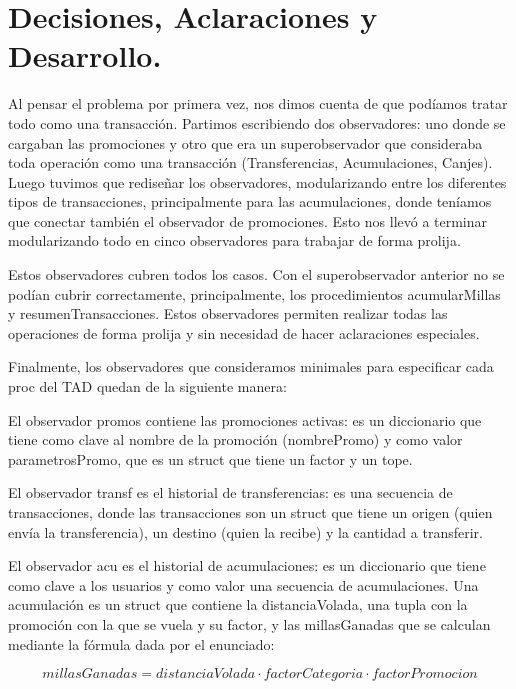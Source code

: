 \documentclass[11pt,a4paper]{article}
\begin{document}
\maketitle

\section{Decisiones, Aclaraciones y Desarrollo.}

Al pensar el problema por primera vez, nos dimos cuenta de que podíamos tratar todo como una transacción. Partimos escribiendo dos observadores: uno donde se cargaban las promociones y otro que era un superobservador que consideraba toda operación como una transacción (Transferencias, Acumulaciones, Canjes). Luego tuvimos que rediseñar los observadores, modularizando entre los diferentes tipos de transacciones, principalmente para las acumulaciones, donde teníamos que conectar también el observador de promociones. Esto nos llevó a terminar modularizando todo en cinco observadores para trabajar de forma prolija.

Estos observadores cubren todos los casos. Con el superobservador anterior no se podían cubrir correctamente, principalmente, los procedimientos acumularMillas y resumenTransacciones. Estos observadores permiten realizar todas las operaciones de forma prolija y sin necesidad de hacer aclaraciones especiales.

Finalmente, los observadores que consideramos minimales para especificar cada proc del TAD quedan de la siguiente manera:

El observador promos contiene las promociones activas: es un diccionario que tiene como clave al nombre de la promoción (nombrePromo) y como valor parametrosPromo, que es un struct que tiene un factor y un tope.

El observador transf es el historial de transferencias: es una secuencia de transacciones, donde las transacciones son un struct que tiene un origen (quien envía la transferencia), un destino (quien la recibe) y la cantidad a transferir.

El observador acu es el historial de acumulaciones: es un diccionario que tiene como clave a los usuarios y como valor una secuencia de acumulaciones. Una acumulación es un struct que contiene la distanciaVolada, una tupla con la promoción con la que se vuela y su factor, y las millasGanadas que se calculan mediante la fórmula dada por el enunciado:

$$
millasGanadas = distanciaVolada \cdot factorCategoria \cdot factorPromocion
$$
\end{document}

